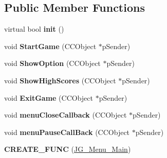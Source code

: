 \subsection*{Public Member Functions}
\begin{DoxyCompactItemize}
\item 
\hypertarget{class_j_g___menu___main_ae015e299e7fd365043d747c6198cd418}{virtual bool {\bfseries init} ()}\label{class_j_g___menu___main_ae015e299e7fd365043d747c6198cd418}

\item 
\hypertarget{class_j_g___menu___main_a2fe8603151794aff6cc616e1728ea0f6}{void {\bfseries Start\-Game} (C\-C\-Object $\ast$p\-Sender)}\label{class_j_g___menu___main_a2fe8603151794aff6cc616e1728ea0f6}

\item 
\hypertarget{class_j_g___menu___main_a2a81f66795c115804736c1a7c8fdb801}{void {\bfseries Show\-Option} (C\-C\-Object $\ast$p\-Sender)}\label{class_j_g___menu___main_a2a81f66795c115804736c1a7c8fdb801}

\item 
\hypertarget{class_j_g___menu___main_a421a5b18671acce05e568ebb88d60976}{void {\bfseries Show\-High\-Scores} (C\-C\-Object $\ast$p\-Sender)}\label{class_j_g___menu___main_a421a5b18671acce05e568ebb88d60976}

\item 
\hypertarget{class_j_g___menu___main_a4bcca0a84227a203081ac9ffacf7f43f}{void {\bfseries Exit\-Game} (C\-C\-Object $\ast$p\-Sender)}\label{class_j_g___menu___main_a4bcca0a84227a203081ac9ffacf7f43f}

\item 
\hypertarget{class_j_g___menu___main_aecbc239ff1644bff785af4e6a72dd516}{void {\bfseries menu\-Close\-Callback} (C\-C\-Object $\ast$p\-Sender)}\label{class_j_g___menu___main_aecbc239ff1644bff785af4e6a72dd516}

\item 
\hypertarget{class_j_g___menu___main_a606ffa5c67ae0d9451922ae2661583c8}{void {\bfseries menu\-Pause\-Call\-Back} (C\-C\-Object $\ast$p\-Sender)}\label{class_j_g___menu___main_a606ffa5c67ae0d9451922ae2661583c8}

\item 
\hypertarget{class_j_g___menu___main_a2abd1c8349ebb5469d4ea533abb69b51}{{\bfseries C\-R\-E\-A\-T\-E\-\_\-\-F\-U\-N\-C} (\hyperlink{class_j_g___menu___main}{J\-G\-\_\-\-Menu\-\_\-\-Main})}\label{class_j_g___menu___main_a2abd1c8349ebb5469d4ea533abb69b51}

\end{DoxyCompactItemize}

